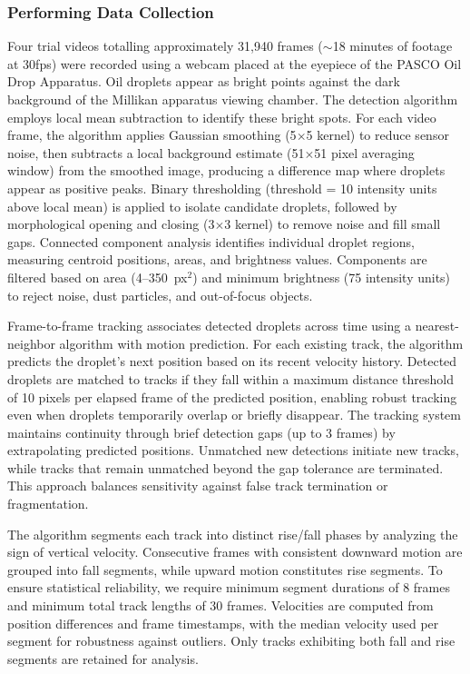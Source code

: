 \documentclass[%
 reprint,
 amsmath,amssymb,
 aps,
]{revtex4-2}
\begin{document}
\subsubsection{Performing Data Collection}

Four trial videos totalling approximately 31,940 frames ($\sim$18 minutes of footage at 30fps) were recorded using a webcam placed at the eyepiece of the PASCO Oil Drop Apparatus.
Oil droplets appear as bright points against the dark background of the Millikan apparatus viewing chamber. The detection algorithm employs local mean subtraction to identify these bright spots. For each video frame, the algorithm applies Gaussian smoothing (5$\times$5 kernel) to reduce sensor noise, then subtracts a local background estimate (51$\times$51 pixel averaging window) from the smoothed image, producing a difference map where droplets appear as positive peaks. Binary thresholding (threshold = 10 intensity units above local mean) is applied to isolate candidate droplets, followed by morphological opening and closing (3$\times$3 kernel) to remove noise and fill small gaps. Connected component analysis identifies individual droplet regions, measuring centroid positions, areas, and brightness values. Components are filtered based on area (4--350~px$^2$) and minimum brightness (75 intensity units) to reject noise, dust particles, and out-of-focus objects.


Frame-to-frame tracking associates detected droplets across time using a nearest-neighbor algorithm with motion prediction. For each existing track, the algorithm predicts the droplet's next position based on its recent velocity history. Detected droplets are matched to tracks if they fall within a maximum distance threshold of 10 pixels per elapsed frame of the predicted position, enabling robust tracking even when droplets temporarily overlap or briefly disappear. The tracking system maintains continuity through brief detection gaps (up to 3 frames) by extrapolating predicted positions. Unmatched new detections initiate new tracks, while tracks that remain unmatched beyond the gap tolerance are terminated. This approach balances sensitivity against false track termination or fragmentation.


The algorithm segments each track into distinct rise/fall phases by analyzing the sign of vertical velocity. Consecutive frames with consistent downward motion are grouped into fall segments, while upward motion constitutes rise segments. To ensure statistical reliability, we require minimum segment durations of 8 frames and minimum total track lengths of 30 frames. Velocities are computed from position differences and frame timestamps, with the median velocity used per segment for robustness against outliers. Only tracks exhibiting both fall and rise segments are retained for analysis.
\end{document}
